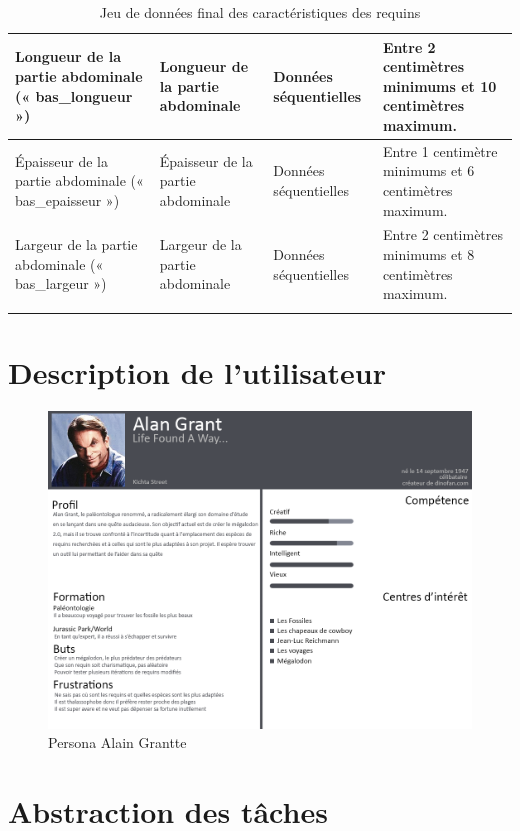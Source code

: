 \documentclass{article}
\begin{document}
\begin{longtable}[h]{|p{} | p{}|p{}|p{}|}
	Longueur de la partie abdominale (« bas\_longueur »)                 & Longueur de la partie abdominale                                                  & Données séquentielles & Entre 2 centimètres minimums et 10 centimètres maximum.    \\ \hline
	Épaisseur de la partie abdominale (« bas\_epaisseur »)               & Épaisseur de la partie abdominale                                                 & Données séquentielles & Entre 1 centimètre minimums et 6 centimètres maximum.      \\ \hline
	Largeur de la partie abdominale (« bas\_largeur »)                   & Largeur de la partie abdominale                                                   & Données séquentielles & Entre 2 centimètres minimums et 8 centimètres maximum.     \\ \hline
	\caption{\label{caracRequins} Jeu de données final des caractéristiques des requins}
\end{longtable}


\clearpage
\section{Description de l’utilisateur}

\begin{figure}[!h]
	\centering
	\includegraphics[width=16.4cm]{assets/personna/alain_grantte.png}
	\caption{\label{assets/persona/alain_grantte} Persona Alain Grantte}
\end{figure}

\newpage
\section{Abstraction des tâches}
\end{document}
